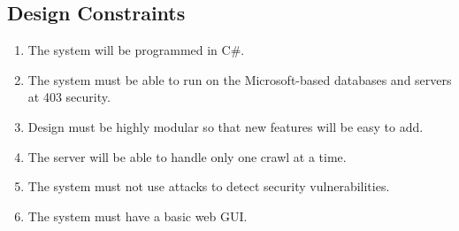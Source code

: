 \subsection{Design Constraints}
\begin{enumerate}
\item The system will be programmed in C\#.
\item The system must be able to run on the Microsoft-based databases and servers at 403 security.
\item Design must be highly modular so that new features will be easy to add.
\item The server will be able to handle only one crawl at a time.
\item The system must not use attacks to detect security vulnerabilities.
\item The system must have a basic web GUI.
\end{enumerate}
